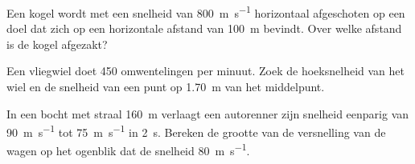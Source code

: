 \documentclass{ximera}
\begin{document}
\begin{exercise}
	Een kogel wordt met een snelheid van \SI{800}{\meter\per\second} horizontaal afgeschoten op een doel dat zich op een horizontale afstand van \SI{100}{\meter} bevindt. Over welke afstand is de kogel afgezakt?
\end{exercise}


\begin{exercise}
	Een vliegwiel doet 450 omwentelingen per minuut. Zoek de hoeksnelheid van het wiel en de snelheid van een punt op \SI{1,70}{\meter} van het middelpunt.
\end{exercise}

\begin{exercise}
	In een bocht met straal \SI{160}{\meter} verlaagt een autorenner zijn snelheid eenparig van \SI{90}{\meter\per\second} tot \SI{75}{\meter\per\second} in \SI{2}{\second}. Bereken de grootte van de versnelling van de wagen op het ogenblik dat de snelheid \SI{80}{\meter\per\second}.
\begin{multipleChoice}
\end{multipleChoice}
\end{exercise}
\end{document}
